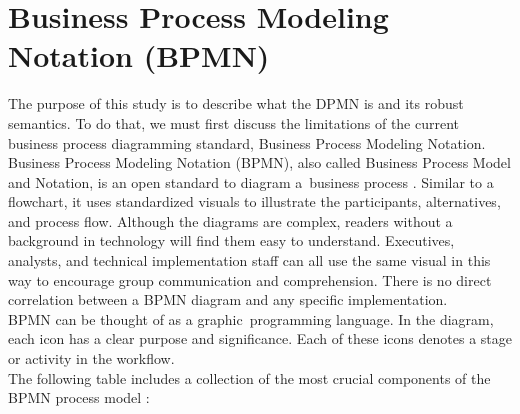 \documentclass{article}
\begin{document}
\section{Business Process Modeling Notation (BPMN)}
The purpose of this study is to describe what the DPMN is and its robust semantics. To do that, we must first discuss the limitations of the current business process diagramming standard, Business Process Modeling Notation.\\
Business Process Modeling Notation (BPMN), also called Business Process Model and Notation, is an open standard to diagram a business process \cite{BPMN}.  Similar to a flowchart, it uses standardized visuals to illustrate the participants, alternatives, and process flow. Although the diagrams are complex, readers without a background in technology will find them easy to understand. Executives, analysts, and technical implementation staff can all use the same visual in this way to encourage group communication and comprehension. There is no direct correlation between a BPMN diagram and any specific implementation. \\
BPMN can be thought of as a graphic programming language. In the diagram, each icon has a clear purpose and significance. Each of these icons denotes a stage or activity in the workflow. \\
The following table includes a collection of the most crucial components of the BPMN process model \cite{Wagner}:
\end{document}
